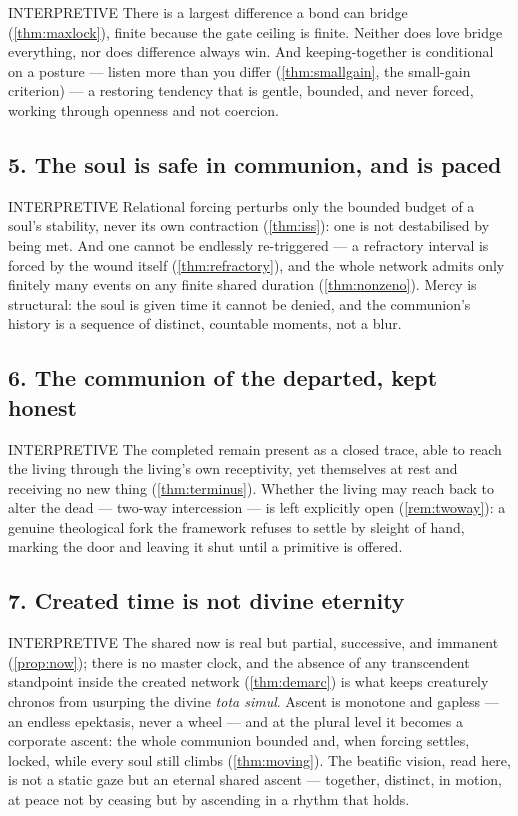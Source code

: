 \documentclass[11pt,a4paper]{article}
\newcommand{\stInterp}{\textcolor{cInt}{\textsf{\small INTERPRETIVE}}}
\theoremstyle{definition}
\theoremstyle{plain}
\theoremstyle{remark}
\begin{document}
\stInterp\quad
There is a largest difference a bond can bridge (\ref{thm:maxlock}), finite because the gate
ceiling is finite. Neither does love bridge everything, nor does difference always win. And
keeping-together is conditional on a posture --- listen more than you differ
(\ref{thm:smallgain}, the small-gain criterion) --- a restoring tendency that is gentle,
bounded, and never forced, working through openness and not coercion.

\subsection*{5. The soul is safe in communion, and is paced}

\stInterp\quad
Relational forcing perturbs only the bounded budget of a soul's stability, never its own
contraction (\ref{thm:iss}): one is not destabilised by being met. And one cannot be
endlessly re-triggered --- a refractory interval is forced by the wound itself
(\ref{thm:refractory}), and the whole network admits only finitely many events on any finite
shared duration (\ref{thm:nonzeno}). Mercy is structural: the soul is given time it cannot be
denied, and the communion's history is a sequence of distinct, countable moments, not a blur.

\subsection*{6. The communion of the departed, kept honest}

\stInterp\quad
The completed remain present as a closed trace, able to reach the living through the living's
own receptivity, yet themselves at rest and receiving no new thing (\ref{thm:terminus}).
Whether the living may reach back to alter the dead --- two-way intercession --- is left
explicitly open (\ref{rem:twoway}): a genuine theological fork the framework refuses to settle
by sleight of hand, marking the door and leaving it shut until a primitive is offered.

\subsection*{7. Created time is not divine eternity}

\stInterp\quad
The shared now is real but partial, successive, and immanent (\ref{prop:now}); there is no
master clock, and the absence of any transcendent standpoint inside the created network
(\ref{thm:demarc}) is what keeps creaturely chronos from usurping the divine \emph{tota
simul}. Ascent is monotone and gapless --- an endless epektasis, never a wheel --- and at the
plural level it becomes a corporate ascent: the whole communion bounded and, when forcing
settles, locked, while every soul still climbs (\ref{thm:moving}). The beatific vision, read
here, is not a static gaze but an eternal shared ascent --- together, distinct, in motion, at
peace not by ceasing but by ascending in a rhythm that holds.
\end{document}
